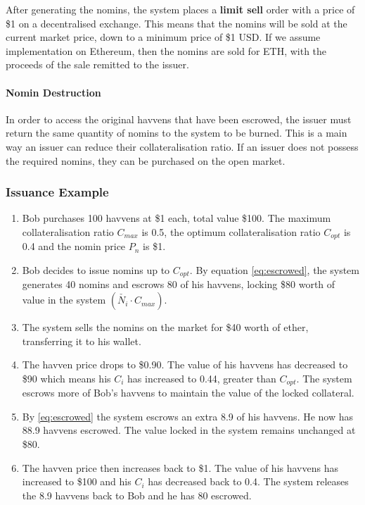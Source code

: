 \noindent After generating the nomins, the system places a \textbf{limit sell} order with a price of \$1 on a decentralised exchange. This means that the nomins will be sold at the current market price, down to a minimum price of \$1 USD. If we assume implementation on Ethereum, then the nomins are sold for ETH, with the proceeds of the sale remitted to the issuer.

\paragraph{Nomin Destruction}

\noindent In order to access the original havvens that have been escrowed, the issuer must return the same quantity of nomins to the system to be burned. This is a main way 
an issuer can reduce their collateralisation ratio. If an issuer does not possess the required nomins, they can be purchased on the open market.

\newpage

\subsubsection{Issuance Example}

\begin{enumerate}
\item{Bob purchases 100 havvens at \$1 each, total value \$100. The maximum collateralisation ratio $C_{max}$ is 0.5, the optimum collateralisation ratio $C_{opt}$ is 0.4 and the nomin price $P_n$ is \$1.}
\item{Bob decides to issue nomins up to $C_{opt}$. By equation \eqref{eq:escrowed}, the system generates 40 nomins and escrows 80 of his havvens, locking \$80 worth of value in the system $ (\check{N_i} \cdot C_{max})$.}
\item{The system sells the nomins on the market for \$40 worth of ether, transferring it to his wallet}.
\item{The havven price drops to \$0.90. The value of his havvens has decreased to \$90 which means his $C_i$ has increased to 0.44, greater than $C_{opt}$. The system escrows more of Bob's havvens to maintain the value of the locked collateral.}
\item{By \eqref{eq:escrowed} the system escrows an extra 8.9 of his havvens. He now has 88.9 havvens escrowed. The value locked in the system remains unchanged at \$80.}
\item{The havven price then increases back to \$1. The value of his havvens has increased to \$100 and his $C_i$ has decreased back to 0.4. The system releases the 8.9 havvens back to Bob and he has 80 escrowed.}
\end{enumerate}

